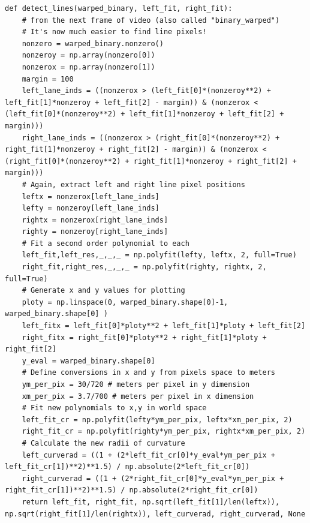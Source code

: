 \documentclass[11pt]{article}
\begin{document}
\begin{verbatim}
def detect_lines(warped_binary, left_fit, right_fit):
    # from the next frame of video (also called "binary_warped")
    # It's now much easier to find line pixels!
    nonzero = warped_binary.nonzero()
    nonzeroy = np.array(nonzero[0])
    nonzerox = np.array(nonzero[1])
    margin = 100
    left_lane_inds = ((nonzerox > (left_fit[0]*(nonzeroy**2) + left_fit[1]*nonzeroy + left_fit[2] - margin)) & (nonzerox < (left_fit[0]*(nonzeroy**2) + left_fit[1]*nonzeroy + left_fit[2] + margin))) 
    right_lane_inds = ((nonzerox > (right_fit[0]*(nonzeroy**2) + right_fit[1]*nonzeroy + right_fit[2] - margin)) & (nonzerox < (right_fit[0]*(nonzeroy**2) + right_fit[1]*nonzeroy + right_fit[2] + margin)))  
    # Again, extract left and right line pixel positions
    leftx = nonzerox[left_lane_inds]
    lefty = nonzeroy[left_lane_inds] 
    rightx = nonzerox[right_lane_inds]
    righty = nonzeroy[right_lane_inds]
    # Fit a second order polynomial to each
    left_fit,left_res,_,_,_ = np.polyfit(lefty, leftx, 2, full=True)
    right_fit,right_res,_,_,_ = np.polyfit(righty, rightx, 2, full=True)
    # Generate x and y values for plotting
    ploty = np.linspace(0, warped_binary.shape[0]-1, warped_binary.shape[0] )
    left_fitx = left_fit[0]*ploty**2 + left_fit[1]*ploty + left_fit[2]
    right_fitx = right_fit[0]*ploty**2 + right_fit[1]*ploty + right_fit[2]
    y_eval = warped_binary.shape[0]
    # Define conversions in x and y from pixels space to meters
    ym_per_pix = 30/720 # meters per pixel in y dimension
    xm_per_pix = 3.7/700 # meters per pixel in x dimension
    # Fit new polynomials to x,y in world space
    left_fit_cr = np.polyfit(lefty*ym_per_pix, leftx*xm_per_pix, 2)
    right_fit_cr = np.polyfit(righty*ym_per_pix, rightx*xm_per_pix, 2)
    # Calculate the new radii of curvature
    left_curverad = ((1 + (2*left_fit_cr[0]*y_eval*ym_per_pix + left_fit_cr[1])**2)**1.5) / np.absolute(2*left_fit_cr[0])
    right_curverad = ((1 + (2*right_fit_cr[0]*y_eval*ym_per_pix + right_fit_cr[1])**2)**1.5) / np.absolute(2*right_fit_cr[0])
    return left_fit, right_fit, np.sqrt(left_fit[1]/len(leftx)), np.sqrt(right_fit[1]/len(rightx)), left_curverad, right_curverad, None
\end{verbatim}
\end{document}
